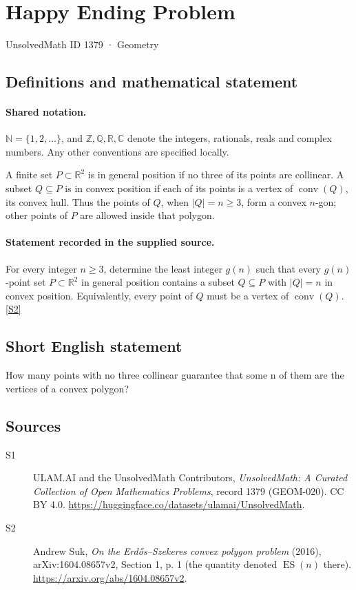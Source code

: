 \documentclass[11pt]{article}
\newcommand{\sref}[2]{\hyperlink{source:#1:#2}{[S#2]}}
\begin{document}
\setcounter{section}{1378}
\section{Happy Ending Problem}\label{1379}
{\small\sffamily UnsolvedMath ID 1379 · Geometry}
\subsection{Definitions and mathematical statement}

\paragraph{Shared notation.}$\mathbb N=\{1,2,\ldots\}$, and $\mathbb Z,\mathbb Q,\mathbb R,\mathbb C$ denote the integers, rationals, reals and complex numbers. Any other conventions are specified locally.


A finite set $P\subset\mathbb R^2$ is in general position if no three of its points are collinear. A subset $Q\subseteq P$ is in convex position if each of its points is a vertex of $\operatorname{conv}(Q)$, its convex hull. Thus the points of $Q$, when $|Q|=n\ge3$, form a convex $n$-gon; other points of $P$ are allowed inside that polygon.
\paragraph{Statement recorded in the supplied source.}
For every integer $n\ge3$, determine the least integer $g(n)$ such that every $g(n)$-point set $P\subset\mathbb R^2$ in general position contains a subset $Q\subseteq P$ with $|Q|=n$ in convex position. Equivalently, every point of $Q$ must be a vertex of $\operatorname{conv}(Q)$. \sref{1379}{2}
\subsection{Short English statement}
How many points with no three collinear guarantee that some n of them are the vertices of a convex polygon?
\subsection{Sources}
\begin{description}
\item[\hypertarget{source:1379:1}{S1}] ULAM.AI and the UnsolvedMath Contributors, \emph{UnsolvedMath: A Curated Collection of Open Mathematics Problems}, record 1379 (GEOM-020). CC BY 4.0. \url{https://huggingface.co/datasets/ulamai/UnsolvedMath}.
\item[\hypertarget{source:1379:2}{S2}] Andrew Suk, \emph{On the Erdős--Szekeres convex polygon problem} (2016), arXiv:1604.08657v2, Section 1, p. 1 (the quantity denoted $\operatorname{ES}(n)$ there). \url{https://arxiv.org/abs/1604.08657v2}.
\end{description}
\label{end:1379}
\end{document}
